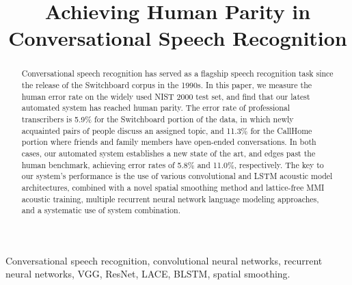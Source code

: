 \documentclass{article}
\title{Achieving Human Parity in Conversational Speech Recognition}
\begin{document}
\maketitle
\begin{abstract}
Conversational speech recognition has 
served as a flagship speech recognition task since the release of the
Switchboard corpus in the 1990s. In this paper, we measure the
human error rate on the widely used NIST 2000 test set, and find that
our latest automated system has reached human parity. The error rate
of professional transcribers is 5.9\% for the Switchboard portion of the data, in which
newly acquainted pairs of people discuss an assigned topic, and 11.3\% for
the CallHome portion where friends and family members have open-ended
conversations. In both cases, our automated system establishes a 
new state of the art, and edges past the human
benchmark, achieving error rates of 5.8\% and 11.0\%, respectively.
The key to our system's performance is the
use of various convolutional and LSTM acoustic model architectures, combined with a novel
spatial smoothing method and lattice-free MMI acoustic training,
multiple recurrent neural network language modeling approaches, 
and a systematic use of system combination.
\end{abstract}
\begin{keywords}
Conversational speech recognition, convolutional neural networks, recurrent neural networks, VGG, ResNet, LACE, BLSTM, spatial smoothing.
\end{keywords}
\end{document}
